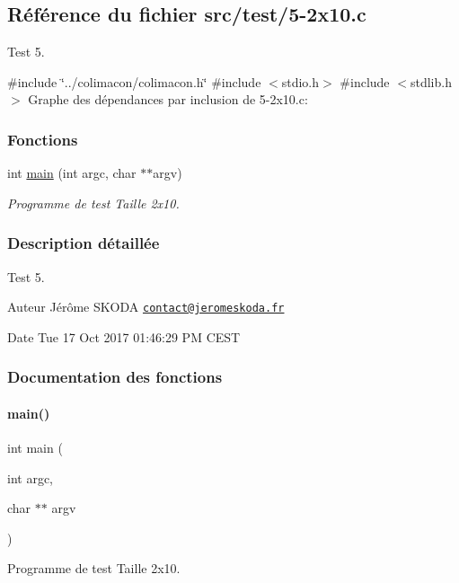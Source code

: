 \hypertarget{5-2x10_8c}{}\subsection{Référence du fichier src/test/5-\/2x10.c}
\label{5-2x10_8c}


Test 5.  


{\ttfamily \#include \char`\"{}../colimacon/colimacon.\+h\char`\"{}}\newline
{\ttfamily \#include $<$stdio.\+h$>$}\newline
{\ttfamily \#include $<$stdlib.\+h$>$}\newline
Graphe des dépendances par inclusion de 5-\/2x10.c\+:
\subsubsection*{Fonctions}
\begin{DoxyCompactItemize}
\item 
int \hyperlink{5-2x10_8c_a3c04138a5bfe5d72780bb7e82a18e627}{main} (int argc, char $\ast$$\ast$argv)
\begin{DoxyCompactList}\small\item\em Programme de test Taille 2x10. \end{DoxyCompactList}\end{DoxyCompactItemize}


\subsubsection{Description détaillée}
Test 5. 

\begin{DoxyAuthor}{Auteur}
Jérôme S\+K\+O\+DA \href{mailto:contact@jeromeskoda.fr}{\tt contact@jeromeskoda.\+fr} 
\end{DoxyAuthor}
\begin{DoxyDate}{Date}
Tue 17 Oct 2017 01\+:46\+:29 PM C\+E\+ST 
\end{DoxyDate}


\subsubsection{Documentation des fonctions}
\mbox{\label{5-2x10_8c_a3c04138a5bfe5d72780bb7e82a18e627}} 
\paragraph{\texorpdfstring{main()}{main()}}
{\footnotesize\ttfamily int main (\begin{DoxyParamCaption}\item[{int}]{argc,  }\item[{char $\ast$$\ast$}]{argv }\end{DoxyParamCaption})}



Programme de test Taille 2x10. 

